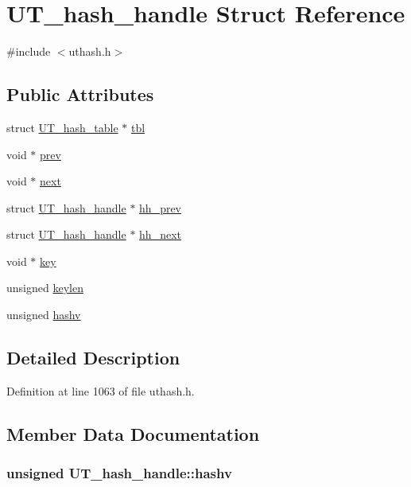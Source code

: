 \hypertarget{struct_u_t__hash__handle}{\section{U\-T\-\_\-hash\-\_\-handle Struct Reference}
\label{struct_u_t__hash__handle}
}


{\ttfamily \#include $<$uthash.\-h$>$}

\subsection*{Public Attributes}
\begin{DoxyCompactItemize}
\item 
struct \hyperlink{struct_u_t__hash__table}{U\-T\-\_\-hash\-\_\-table} $\ast$ \hyperlink{struct_u_t__hash__handle_ad90bfc052210ed0dfe1afcf51f3a89b5}{tbl}
\item 
void $\ast$ \hyperlink{struct_u_t__hash__handle_af266811bcd29460133f308987124034e}{prev}
\item 
void $\ast$ \hyperlink{struct_u_t__hash__handle_ac20c29619fd7716f7ba517a2cd651d27}{next}
\item 
struct \hyperlink{struct_u_t__hash__handle}{U\-T\-\_\-hash\-\_\-handle} $\ast$ \hyperlink{struct_u_t__hash__handle_a7426418517c3a1e93fe477e643f60e70}{hh\-\_\-prev}
\item 
struct \hyperlink{struct_u_t__hash__handle}{U\-T\-\_\-hash\-\_\-handle} $\ast$ \hyperlink{struct_u_t__hash__handle_a68446f17ac973f8e7e483ec3eca4891c}{hh\-\_\-next}
\item 
void $\ast$ \hyperlink{struct_u_t__hash__handle_a426a06699977756c3b26667ede8f7a2a}{key}
\item 
unsigned \hyperlink{struct_u_t__hash__handle_af2abdc405972a6bbdee2ade2c0f346c4}{keylen}
\item 
unsigned \hyperlink{struct_u_t__hash__handle_aae5e635fa110556e5007f627089f8323}{hashv}
\end{DoxyCompactItemize}


\subsection{Detailed Description}


Definition at line 1063 of file uthash.\-h.



\subsection{Member Data Documentation}
\hypertarget{struct_u_t__hash__handle_aae5e635fa110556e5007f627089f8323}{
\subsubsection[{hashv}]{\setlength{\rightskip}{0pt plus 5cm}unsigned U\-T\-\_\-hash\-\_\-handle\-::hashv}}\label{struct_u_t__hash__handle_aae5e635fa110556e5007f627089f8323}


